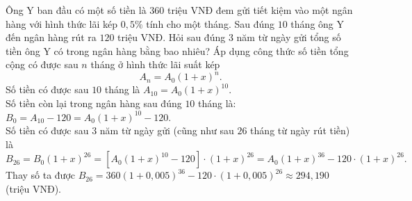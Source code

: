 \begin{bt}%
Ông Y ban đầu có một số tiền là $ 360 $ triệu VNĐ đem gửi tiết kiệm vào một ngân hàng với hình thức lãi kép $0{,}5 \%$ tính cho một tháng. Sau đúng $ 10 $ tháng ông Y đến ngân hàng rút ra $ 120 $ triệu VNĐ. Hỏi sau đúng $ 3 $ năm từ ngày gửi tổng số tiền ông Y có trong ngân hàng bằng bao nhiêu?
\loigiai
{ Áp dụng công thức số tiền tổng cộng có được sau $n$ tháng ở hình thức lãi suất kép \[A_{n}=A_{0}(1+x)^{n}.\]
Số tiền có được sau $ 10 $ tháng là $A_{10}=A_{0}(1+x)^{10}$.\\
Số tiền còn lại trong ngân hàng sau đúng $ 10 $ tháng là: $B_{0}=A_{10}-120=A_{0}(1+x)^{10}-120$.\\
Số tiền có được sau $ 3 $ năm từ ngày gửi (cũng như sau $ 26 $ tháng từ ngày rút tiền) là
\[B_{26}=B_{0}(1+x)^{26}=\left[A_{0}(1+x)^{10}-120\right] \cdot(1+x)^{26}=A_{0}(1+x)^{36}-120 \cdot(1+x)^{26}.\]
Thay số ta được $B_{26}=360(1+0{,}005)^{36}-120 \cdot(1+0{,}005)^{26} \approx 294{,}190$ (triệu VNĐ).
}
\end{bt}